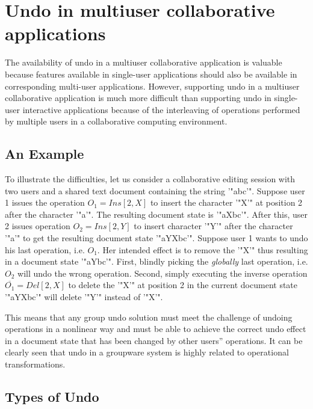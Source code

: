 \appendix

\section{Undo in multiuser collaborative applications}
\label{sect:undo}

The availability of undo in a multiuser collaborative application is valuable because features available in single-user applications should also be available in corresponding multi-user applications. However, supporting undo in a multiuser collaborative application is much more difficult than supporting undo in single-user interactive applications because of the interleaving of operations performed by multiple users in a collaborative computing environment.


\subsection{An Example}

To illustrate the difficulties, let us consider a collaborative editing session with two users and a shared text document containing the string '"abc'". Suppose user 1 issues the operation $O_{1} = Ins[2,X]$ to insert the character '"X'" at position 2 after the character '"a'". The resulting document state is '"aXbc'". After this, user 2 issues operation $O_{2} = Ins[2,Y]$ to insert character '"Y'" after the character '"a'" to get the resulting document state '"aYXbc'". Suppose user 1 wants to undo his last operation, i.e. $O_{1}$. Her intended effect is to remove the '"X'" thus resulting in a document state '"aYbc'". First, blindly picking the \emph{globally} last operation, i.e. $O_{2}$ will undo the wrong operation. Second, simply executing the inverse operation $\overline{O_{1}} = Del[2,X]$ to delete the '"X'" at position 2 in the current document state '"aYXbc'" will delete '"Y'" instead of '"X'".

This means that any group undo solution must meet the challenge of undoing operations in a nonlinear way and must be able to achieve the correct undo effect in a document state that has been changed by other users'' operations. It can be clearly seen that undo in a groupware system is highly related to operational transformations.


\subsection{Types of Undo}

